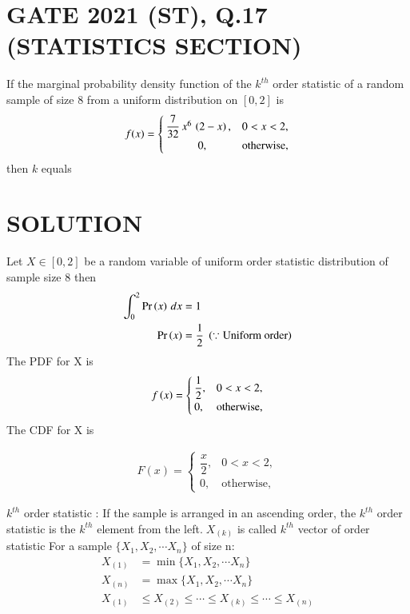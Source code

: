 \documentclass[journal,12pt,twocolumn]{IEEEtran}
\begin{document}
\section{GATE 2021 (ST), Q.17 (STATISTICS SECTION)} 
If the marginal probability density function of the $k^{th}$ order statistic of a 
random sample of size 8 from a uniform distribution on $[0,2]$ is
\[
  f(x) =
  \begin{cases}
   \dfrac{7}{32}\,x^{6}\,\left(2-x\right),  & 0<x<2, \\ 
      \hspace{1cm}   0,               & \text{otherwise,} 
  \end{cases}
\]
then $k$ equals \underline{\hspace{3cm}}
\bigskip
\section{SOLUTION}
Let $X\in[0,2]$ be a random variable of uniform order statistic distribution of sample size 8 then
\begin{align}
 \int_{0}^{2} \Pr\left(x\right)\,dx &= 1 \\
 \Pr\left(x\right)                  &= \dfrac{1}{2}\;\left(\because \text{Uniform order}\right)
\end{align}
The PDF for X is 
\begin{align}
f\left(x\right) = 
 \begin{cases}
  \dfrac{1}{2},      &0<x<2, \\ 
     0, &\text{otherwise,}
 \end{cases} \label{d}
\end{align}
 The CDF for X is 
 
 \begin{align}
 F(x) = 
 \begin{cases}
  \dfrac{x}{2},      &0<x<2, \\ 
     0, &\text{otherwise,}
 \end{cases} \label{e}
 \end{align}
 
\newpage

\begin{definition}
$k^{th}$ order statistic : If the sample is arranged in an ascending order, the $k^{th}$ order statistic is the $k^{th}$ element from the left.$\;X_{(k)}$ is called $k^{th}$ vector of order statistic  
For a sample $\{X_1, X_2, \cdots X_n\}$ of size n:
\begin{align}
X_{(1)} &= \min{\{X_1, X_2, \cdots X_n\}}\\
X_{(n)} &= \max{\{X_1, X_2, \cdots X_n\}} \\
X_{(1)} &\leq X_{(2)}\leq \cdots\leq X_{(k)}\leq \cdots \leq X_{(n)} 
\end{align}
\end{definition}
\end{document}
